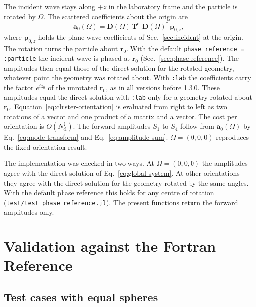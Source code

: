 \documentclass[11pt,a4paper]{article}
\begin{document}
The incident wave stays along $+z$ in the laboratory frame and the particle is rotated by $\Omega$.
The scattered coefficients about the origin are
\begin{equation}
  \bm{a}_0(\Omega) = \mathbf{D}(\Omega)\,\mathbf{T}^\mathrm{cl}\,\mathbf{D}(\Omega)^\dagger\,\bm{p}_{0,z},
  \label{eq:cluster-orientation}
\end{equation}
where $\bm{p}_{0,z}$ holds the plane-wave coefficients of Sec.~\ref{sec:incident} at the origin.
The rotation turns the particle about $\bm{r}_0$.
With the default \texttt{phase\_reference = :particle} the incident wave is phased at $\bm{r}_0$ (Sec.~\ref{sec:phase-reference}).
The amplitudes then equal those of the direct solution for the rotated geometry, whatever point the geometry was rotated about.
With \texttt{:lab} the coefficients carry the factor $e^{i z_0}$ of the unrotated $\bm{r}_0$, as in all versions before 1.3.0.
These amplitudes equal the direct solution with \texttt{:lab} only for a geometry rotated about $\bm{r}_0$.
Equation~\eqref{eq:cluster-orientation} is evaluated from right to left as two rotations of a vector and one product of a matrix and a vector.
The cost per orientation is $O(N_\mathrm{cl}^2)$.
The forward amplitudes $S_1$ to $S_4$ follow from $\bm{a}_0(\Omega)$ by Eq.~\eqref{eq:mode-transform} and Eq.~\eqref{eq:amplitude-sum}.
$\Omega = (0, 0, 0)$ reproduces the fixed-orientation result.

The implementation was checked in two ways.
At $\Omega = (0,0,0)$ the amplitudes agree with the direct solution of Eq.~\eqref{eq:global-system}.
At other orientations they agree with the direct solution for the geometry rotated by the same angles.
With the default phase reference this holds for any centre of rotation (\texttt{test/test\_phase\_reference.jl}).
The present functions return the forward amplitudes only.

\section{Validation against the Fortran Reference}
\label{sec:validation}

\subsection{Test cases with equal spheres}
\label{sec:validation-equal}
\end{document}
